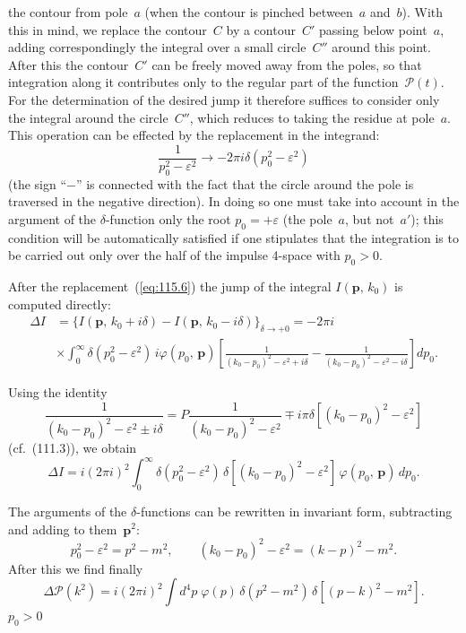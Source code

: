 
\noindent the contour from pole~$a$ (when the contour is pinched between~$a$ and~$b$). With this in mind, we replace the contour~$C$ by a contour~$C'$ passing below point~$a$, adding correspondingly the integral over a small circle~$C''$ around this point. After this the contour~$C'$ can be freely moved away from the poles, so that integration along it contributes only to the regular part of the function~$\mathcal{P}(t)$. For the determination of the desired jump it therefore suffices to consider only the integral around the circle~$C''$, which reduces to taking the residue at pole~$a$. This operation can be effected by the replacement in the integrand:
\begin{equation}
\frac{1}{p_0^2 - \varepsilon^2} \to -2\pi i\delta(p_0^2 - \varepsilon^2)
\label{eq:115.6}
\end{equation}
(the sign ``$-$'' is connected with the fact that the circle around the pole is traversed in the negative direction). In doing so one must take into account in the argument of the $\delta$-function only the root $p_0 = +\varepsilon$ (the pole~$a$, but not~$a'$); this condition will be automatically satisfied if one stipulates that the integration is to be carried out only over the half of the impulse 4-space with $p_0 > 0$.

After the replacement~(\ref{eq:115.6}) the jump of the integral $I(\mathbf{p},\,k_0)$ is computed directly:
\begin{align*}
\Delta I &= \{I(\mathbf{p},\,k_0 + i\delta) - I(\mathbf{p},\,k_0 - i\delta)\}_{\delta\to+0} = -2\pi i \\
&\times \int_0^\infty \delta(p_0^2 - \varepsilon^2)\,i\varphi(p_0,\,\mathbf{p})\left[\frac{1}{(k_0 - p_0)^2 - \varepsilon^2 + i\delta} - \frac{1}{(k_0 - p_0)^2 - \varepsilon^2 - i\delta}\right]dp_0.
\end{align*}

Using the identity
\[
\frac{1}{(k_0 - p_0)^2 - \varepsilon^2 \pm i\delta} = P\frac{1}{(k_0 - p_0)^2 - \varepsilon^2} \mp i\pi\delta[(k_0 - p_0)^2 - \varepsilon^2]
\]
(cf.~(111.3)), we obtain
\[
\Delta I = i(2\pi i)^2 \int_0^\infty \delta(p_0^2 - \varepsilon^2)\,\delta[(k_0 - p_0)^2 - \varepsilon^2]\,\varphi(p_0,\,\mathbf{p})\,dp_0.
\]

The arguments of the $\delta$-functions can be rewritten in invariant form, subtracting and adding to them~$\mathbf{p}^2$:
\[
p_0^2 - \varepsilon^2 = p^2 - m^2, \qquad (k_0 - p_0)^2 - \varepsilon^2 = (k - p)^2 - m^2.
\]
After this we find finally
\begin{equation}
\Delta\mathcal{P}(k^2) = i(2\pi i)^2 \int d^4p\;\varphi(p)\,\delta(p^2 - m^2)\,\delta[(p - k)^2 - m^2].
\label{eq:115.7}
\end{equation}
\hspace*{\fill}$p_0 > 0$

